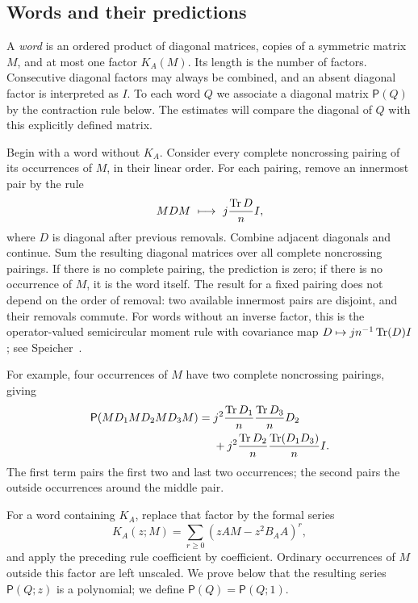 \subsection{Words and their predictions}

A \emph{word} is an ordered product of diagonal matrices, copies of a
symmetric matrix $M$, and at most one factor $K_A(M)$.  Its length is
the number of factors.  Consecutive diagonal factors may always be
combined, and an absent diagonal factor is interpreted as $I$.
To each word $Q$ we associate a diagonal matrix $\mathsf P(Q)$ by
the contraction rule below.  The estimates will compare the diagonal
of $Q$ with this explicitly defined matrix.

Begin with a word without $K_A$.  Consider every complete
noncrossing pairing of its occurrences of $M$, in their linear
order.  For each pairing, remove an innermost pair by the rule
\begin{equation}\label{eq:noncrossing-contraction}
 MDM\ \longmapsto\ j\frac{\operatorname{Tr} D}{n}I,
\end{equation}
where $D$ is diagonal after previous removals.  Combine adjacent
diagonals and continue.  Sum the resulting diagonal matrices over
all complete noncrossing pairings.  If there is no complete pairing,
the prediction is zero; if there is no occurrence of $M$, it is the
word itself.  The result for a fixed pairing does not depend on the
order of removal: two available innermost pairs are disjoint, and
their removals commute.
For words without an inverse factor, this is the operator-valued
semicircular moment rule with covariance map
$D\mapsto jn^{-1}\operatorname{Tr}(D)I$; see Speicher~\cite{Speicher1998}.

For example, four occurrences of $M$ have two complete noncrossing
pairings, giving
\[
 \begin{split}
 \mathsf P(MD_1MD_2MD_3M)
 ={}&j^2\frac{\operatorname{Tr} D_1}{n}\frac{\operatorname{Tr} D_3}{n}D_2\\
 &+j^2\frac{\operatorname{Tr} D_2}{n}\frac{\operatorname{Tr}(D_1D_3)}n I.
 \end{split}
\]
The first term pairs the first two and last two occurrences; the second
pairs the outside occurrences around the middle pair.

For a word containing $K_A$, replace that factor by the formal series
\begin{equation}\label{eq:K-formal-series}
 K_A(z;M)=\sum_{r\ge0}(zAM-z^2B_AA)^r,
\end{equation}
and apply the preceding rule coefficient by coefficient.  Ordinary
occurrences of $M$ outside this factor are left unscaled.  We prove
below that the resulting series $\mathsf P(Q;z)$ is a polynomial;
we define $\mathsf P(Q)=\mathsf P(Q;1)$.

